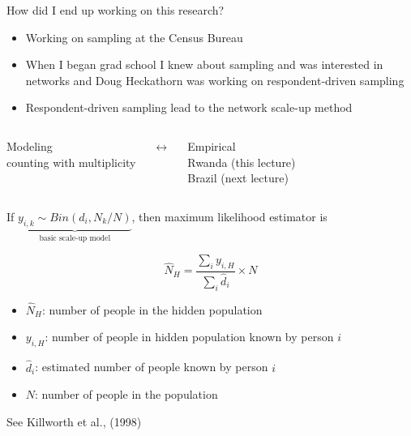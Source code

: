 \documentclass[aspectratio=169]{beamer}
\begin{document}
\begin{frame}

How did I end up working on this research?\pause
\begin{itemize}
\item Working on sampling at the Census Bureau \pause
\item When I began grad school I knew about sampling and was interested in networks and Doug Heckathorn was working on respondent-driven sampling \pause
\item Respondent-driven sampling lead to the network scale-up method
\end{itemize}

\end{frame}
\begin{frame}

\begin{columns}[t] %

\begin{center}
{\Large Modeling}\\
counting with multiplicity
\end{center}

\begin{center}
{\Large $\leftrightarrow$}
\end{center}

\begin{center}
{\Large Empirical}\\
Rwanda (this lecture)\\
Brazil (next lecture) \\
\end{center}
\end{columns}

\end{frame}
\begin{frame}

If $\underbrace{y_{i,k} \sim Bin(d_i, N_k/N)}_\text{basic scale-up model}$, then maximum likelihood estimator is 

\begin{equation*}
\hat{N}_H = \frac{\sum_i y_{i,H}}{\sum_i \hat{d}_i} \times N
\end{equation*}
\small{
\begin{itemize}
\item $\hat{N}_H$: number of people in the hidden population
\item $y_{i,H}$: number of people in hidden population known by person $i$
\item $\hat{d}_i$: estimated number of people known by person $i$
\item $N$: number of people in the population
\end{itemize}
}
\vfill
See Killworth et al., (1998)
\end{frame}
\end{document}
